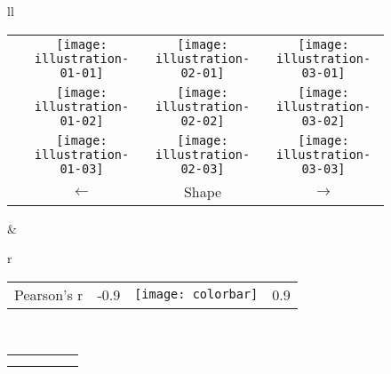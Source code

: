 \documentclass{llncs}
\begin{document}
\begin{figure}[t!]
\scriptsize
\centering
\begin{tabular}{ll}
\begin{tabular}{lccc}
  \raisebox{2.5mm}{\rotatebox[origin=c]{90}{ $ \longrightarrow $ } }&
\texttt{[image: illustration-01-01]} &
\texttt{[image: illustration-02-01]} &
\texttt{[image: illustration-03-01]} \\
  \raisebox{2.5mm}{\rotatebox[origin=c]{90}{ Size } }&
\texttt{[image: illustration-01-02]} &
\texttt{[image: illustration-02-02]} &
\texttt{[image: illustration-03-02]} \\
  \raisebox{2.5mm}{\rotatebox[origin=c]{90}{ $ \longleftarrow $ }} &
\texttt{[image: illustration-01-03]} &
\texttt{[image: illustration-02-03]} &
\texttt{[image: illustration-03-03]} \\
  & $ \longleftarrow $ & Shape & $ \longrightarrow $ \\
\end{tabular}
        &
\begin{tabular}{r}
\begin{tabular}{lrcr}
 Pearson's r  &-0.9 & \texttt{[image: colorbar]} & 0.9
\end{tabular}\\
\begin{tabular}{rl|ccc}
        \hline 
  \rotatebox[origin=c]{90}{ VBM} & &
  \raisebox{-3mm}{\texttt{[image: cor-mass-intensity]}} &
  \raisebox{-3mm}{\texttt{[image: cor-rx-ry-intensity]} }&
  \raisebox{-3mm}{\texttt{[image: cor-rx-ry-mass-intensity]}} \\ 
  \hline
  \hline
  \raisebox{2mm}{ \multirow{2}{1.5mm}{ \rotatebox[origin=c]{90}{UTM} }} &
  \raisebox{1mm}{\rotatebox[origin=c]{90}{Cost}}&
  \raisebox{-2mm}{\texttt{[image: cor-mass-cost]} }&
  \raisebox{-2mm}{\texttt{[image: cor-rx-ry-cost]} }&
  \raisebox{-2mm}{\texttt{[image: cor-rx-ry-mass-cost]} } \\
  &
  \raisebox{1mm}{\rotatebox[origin=c]{90}{Mass}}&
  \raisebox{-2mm}{\texttt{[image: cor-mass-mass-border]} }&

\end{tabular}
\end{tabular}
\end{tabular}
\end{figure}
\end{document}
